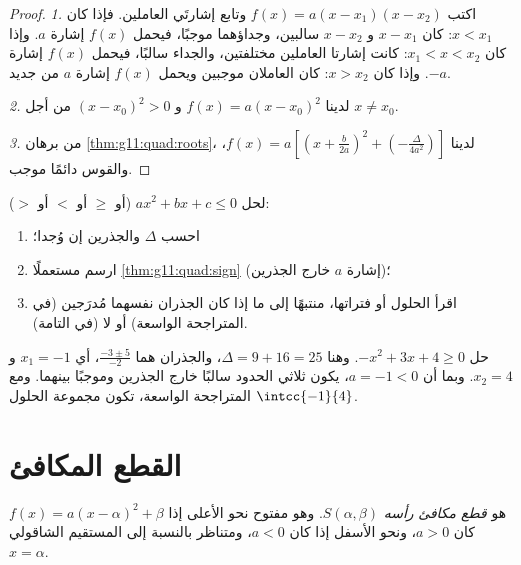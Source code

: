 \begin{proof}
\emph{1.} اكتب $f(x) = a(x-x_1)(x-x_2)$ وتابع إشارتَي
العاملين. فإذا كان $x < x_1$: كان $x - x_1$ و $x - x_2$ سالبين، وجداؤهما
موجبًا، فيحمل $f(x)$ إشارة $a$. وإذا كان $x_1 < x < x_2$: كانت
إشارتا العاملين مختلفتين، والجداء سالبًا، فيحمل $f(x)$
إشارة $-a$. وإذا كان $x > x_2$: كان العاملان موجبين ويحمل $f(x)$
إشارة $a$ من جديد.

\emph{2.} لدينا $f(x) = a(x - x_0)^2$ و $(x-x_0)^2 > 0$ من أجل $x \neq x_0$.

\emph{3.} من برهان \cref{thm:g11:quad:roots}، لدينا
$f(x) = a\left[\left(x + \frac{b}{2a}\right)^2 +
\left(-\frac{\Delta}{4a^2}\right)\right]$، والقوس دائمًا
موجب.
\end{proof}

\begin{method}\label{met:g11:quad:inequalities}
لحل $ax^2 + bx + c \leq 0$ (أو $\geq$ أو $<$ أو $>$):
\begin{enumerate}
  \item احسب $\Delta$ والجذرين إن وُجدا؛
  \item ارسم  مستعملًا \cref{thm:g11:quad:sign} (إشارة $a$
        خارج الجذرين)؛
  \item اقرأ  الحلول أو فتراتها، منتبهًا إلى ما إذا كان
        الجذران نفسهما مُدرَجين (في المتراجحة الواسعة) أو لا (في التامة).
\end{enumerate}
\end{method}

\begin{example}\label{ex:g11:quad:inequality}
حل $-x^2 + 3x + 4 \geq 0$. وهنا $\Delta = 9 + 16 = 25$، والجذران
هما $\frac{-3 \pm 5}{-2}$، أي $x_1 = -1$ و $x_2 = 4$. وبما أن
$a = -1 < 0$، يكون ثلاثي الحدود سالبًا خارج الجذرين وموجبًا
بينهما. ومع المتراجحة الواسعة، تكون مجموعة الحلول
$\intcc{-1}{4}$.
\end{example}

\section{القطع المكافئ}

\begin{definition}\label{def:g11:quad:parabola}
  $f(x) = a(x-\alpha)^2+\beta$ هو
\emph{قطع مكافئ} \emph{رأسه} $S(\alpha, \beta)$. وهو
مفتوح نحو الأعلى إذا كان $a > 0$، ونحو الأسفل إذا كان $a < 0$، ومتناظر بالنسبة إلى
المستقيم الشاقولي $x = \alpha$.
\end{definition}


